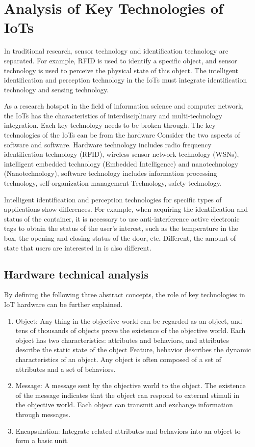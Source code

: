 \documentclass[a4paper,11pt]{article}
\begin{document}
\section{Analysis of Key Technologies of IoTs}
In traditional research, sensor technology and identification technology are separated. For example, RFID is used to identify a specific object, and sensor technology is used to perceive the physical state of this object. The intelligent identification and perception technology in the IoTs must integrate identification technology and sensing technology.

As a research hotspot in the field of information science and computer network, the IoTs has the characteristics of interdisciplinary and multi-technology integration. Each key technology needs to be broken through\cite{6}. The key technologies of the IoTs can be from the hardware Consider the two aspects of software and software. Hardware technology includes radio frequency identification technology (RFID), wireless sensor network technology (WSNs), intelligent embedded technology (Embedded Intelligence) and nanotechnology (Nanotechnology), software technology includes information processing technology, self-organization management Technology, safety technology.

Intelligent identification and perception technologies for specific types of applications show differences. For example, when acquiring the identification and status of the container, it is necessary to use anti-interference active electronic tags to obtain the status of the user's interest, such as the temperature in the box, the opening and closing status of the door, etc. Different, the amount of state that users are interested in is also different.
\subsection{Hardware technical analysis}
By defining the following three abstract concepts, the role of key technologies in IoT hardware can be further explained.
\begin{enumerate}
    \item Object: Any thing in the objective world can be regarded as an object, and tens of thousands of objects prove the existence of the objective world. Each object has two characteristics: attributes and behaviors, and attributes describe the static state of the object Feature, behavior describes the dynamic characteristics of an object. Any object is often composed of a set of attributes and a set of behaviors.
    \item Message: A message sent by the objective world to the object. The existence of the message indicates that the object can respond to external stimuli in the objective world. Each object can transmit and exchange information through messages.
    \item Encapsulation: Integrate related attributes and behaviors into an object to form a basic unit.
\end{enumerate}
\end{document}

